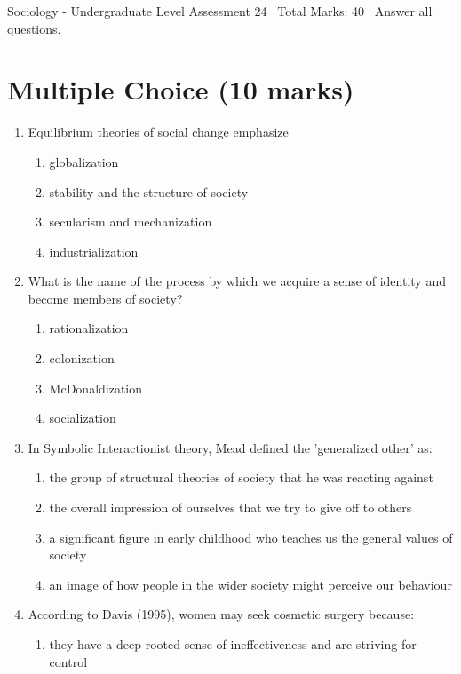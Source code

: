 \documentclass[12pt]{article}
\begin{document}
\begin{center}
Sociology - Undergraduate Level Assessment 24 \
Total Marks: 40 \
Answer all questions.
\end{center}

\section*{Multiple Choice (10 marks)}
\begin{enumerate}[label=\arabic*.]
\item Equilibrium theories of social change emphasize
\begin{enumerate}[label=(\alph*)]
    \item globalization
    \item stability and the structure of society
    \item secularism and mechanization
    \item industrialization
\end{enumerate}
\item What is the name of the process by which we acquire a sense of identity and become members of society?
\begin{enumerate}[label=(\alph*)]
    \item rationalization
    \item colonization
    \item McDonaldization
    \item socialization
\end{enumerate}
\item In Symbolic Interactionist theory, Mead defined the 'generalized other' as:
\begin{enumerate}[label=(\alph*)]
    \item the group of structural theories of society that he was reacting against
    \item the overall impression of ourselves that we try to give off to others
    \item a significant figure in early childhood who teaches us the general values of society
    \item an image of how people in the wider society might perceive our behaviour
\end{enumerate}
\item According to Davis (1995), women may seek cosmetic surgery because:
\begin{enumerate}[label=(\alph*)]
    \item they have a deep-rooted sense of ineffectiveness and are striving for control

\end{enumerate}
\end{enumerate}
\end{document}
